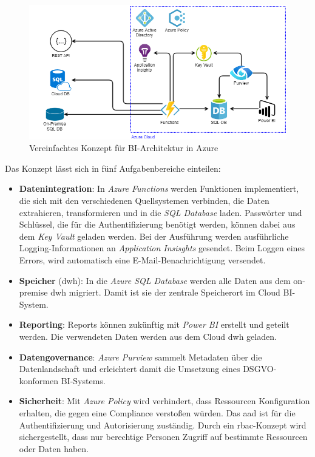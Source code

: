 \begin{figure}[htbp]
 \centering
 \includegraphics[width=\textwidth]{gfx/konzept_1.png}
 \caption{Vereinfachtes Konzept für BI-Architektur in Azure}
\label{fig:chap03_4_konzeptArchitektur_offen}
\end{figure}

Das Konzept lässt sich in fünf Aufgabenbereiche einteilen:
\begin{itemize}
\item \textbf{Datenintegration}: In \textit{Azure Functions} werden Funktionen implementiert, die sich mit den verschiedenen Quellsystemen verbinden, die Daten extrahieren, transformieren und in die \textit{SQL Database} laden. Passwörter und Schlüssel, die für die Authentifizierung benötigt werden, können dabei aus dem \textit{Key Vault} geladen werden. Bei der Ausführung werden ausführliche Logging-Informationen an \textit{Application Insisghts} gesendet. Beim Loggen eines Errors, wird automatisch eine E-Mail-Benachrichtigung versendet.
\item \textbf{Speicher} (\ac{dwh}): In die \textit{Azure SQL Database} werden alle Daten aus dem on-premise \ac{dwh} migriert. Damit ist sie der zentrale Speicherort im Cloud BI-System.
\item \textbf{Reporting}: Reports können zukünftig mit \textit{Power BI} erstellt und geteilt werden. Die verwendeten Daten werden aus dem Cloud \ac{dwh} geladen. 
\item \textbf{Datengovernance}: \textit{Azure Purview} sammelt Metadaten über die Datenlandschaft und erleichtert damit die Umsetzung eines DSGVO-konformen BI-Systems.
\item \textbf{Sicherheit}: Mit \textit{Azure Policy} wird verhindert, dass Ressourcen Konfiguration erhalten, die gegen eine Compliance verstoßen würden. Das \ac{aad} ist für die Authentifizierung und Autorisierung zuständig. Durch ein \ac{rbac}-Konzept wird sichergestellt, dass nur berechtige Personen Zugriff auf bestimmte Ressourcen oder Daten haben. 
\end{itemize}

